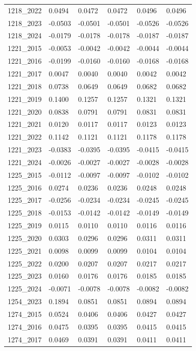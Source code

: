 \begin{table}[htbp]
\begin{tabular}{llllll}
1218_2022 & 0.0494 & 0.0472 & 0.0472 & 0.0496 & 0.0496 \\
1218_2023 & -0.0503 & -0.0501 & -0.0501 & -0.0526 & -0.0526 \\
1218_2024 & -0.0179 & -0.0178 & -0.0178 & -0.0187 & -0.0187 \\
1221_2015 & -0.0053 & -0.0042 & -0.0042 & -0.0044 & -0.0044 \\
1221_2016 & -0.0199 & -0.0160 & -0.0160 & -0.0168 & -0.0168 \\
1221_2017 & 0.0047 & 0.0040 & 0.0040 & 0.0042 & 0.0042 \\
1221_2018 & 0.0738 & 0.0649 & 0.0649 & 0.0682 & 0.0682 \\
1221_2019 & 0.1400 & 0.1257 & 0.1257 & 0.1321 & 0.1321 \\
1221_2020 & 0.0838 & 0.0791 & 0.0791 & 0.0831 & 0.0831 \\
1221_2021 & 0.0120 & 0.0117 & 0.0117 & 0.0123 & 0.0123 \\
1221_2022 & 0.1142 & 0.1121 & 0.1121 & 0.1178 & 0.1178 \\
1221_2023 & -0.0383 & -0.0395 & -0.0395 & -0.0415 & -0.0415 \\
1221_2024 & -0.0026 & -0.0027 & -0.0027 & -0.0028 & -0.0028 \\
1225_2015 & -0.0112 & -0.0097 & -0.0097 & -0.0102 & -0.0102 \\
1225_2016 & 0.0274 & 0.0236 & 0.0236 & 0.0248 & 0.0248 \\
1225_2017 & -0.0256 & -0.0234 & -0.0234 & -0.0245 & -0.0245 \\
1225_2018 & -0.0153 & -0.0142 & -0.0142 & -0.0149 & -0.0149 \\
1225_2019 & 0.0115 & 0.0110 & 0.0110 & 0.0116 & 0.0116 \\
1225_2020 & 0.0303 & 0.0296 & 0.0296 & 0.0311 & 0.0311 \\
1225_2021 & 0.0098 & 0.0099 & 0.0099 & 0.0104 & 0.0104 \\
1225_2022 & 0.0200 & 0.0207 & 0.0207 & 0.0217 & 0.0217 \\
1225_2023 & 0.0160 & 0.0176 & 0.0176 & 0.0185 & 0.0185 \\
1225_2024 & -0.0071 & -0.0078 & -0.0078 & -0.0082 & -0.0082 \\
1254_2023 & 0.1894 & 0.0851 & 0.0851 & 0.0894 & 0.0894 \\
1274_2015 & 0.0524 & 0.0406 & 0.0406 & 0.0427 & 0.0427 \\
1274_2016 & 0.0475 & 0.0395 & 0.0395 & 0.0415 & 0.0415 \\
1274_2017 & 0.0469 & 0.0391 & 0.0391 & 0.0411 & 0.0411 \\

\end{tabular}
\end{table}
